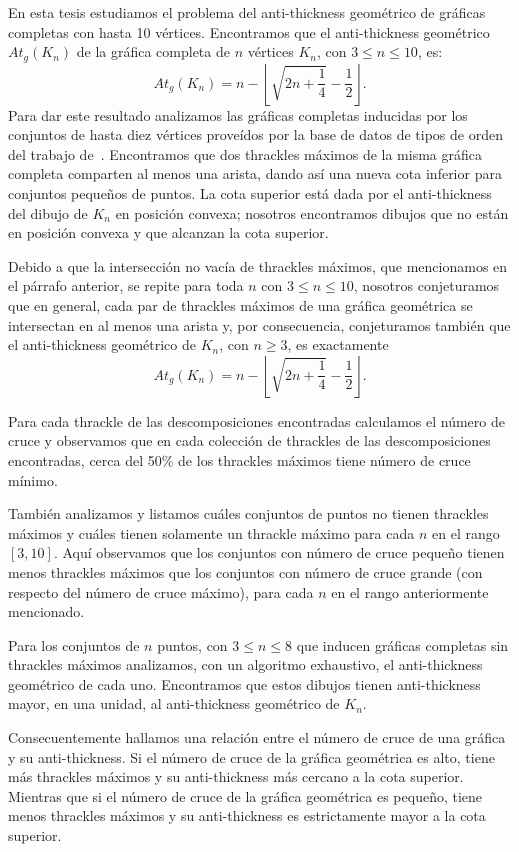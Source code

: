 En esta tesis estudiamos el problema del anti-thickness geométrico de gráficas completas con hasta 10
vértices. Encontramos que el anti-thickness geométrico $At_g(K_n)$ de la gráfica completa de $n$
vértices $K_n$, con $ 3 \leq n \leq 10$, es:
\[ At_g(K_n) =  n - \left\lfloor \sqrt{2n + \frac{1}{4}} - \frac{1}{2}\right\rfloor. \]
Para dar este resultado analizamos las gráficas completas inducidas por los conjuntos de hasta diez
vértices proveídos por la base de datos de tipos de orden del trabajo de~\cite{Aichholzer2001}. Encontramos
que dos thrackles máximos de la misma gráfica completa comparten al menos una arista, dando así una nueva
cota inferior para conjuntos pequeños de puntos. La cota superior está dada por el anti-thickness del
dibujo de $K_n$ en posición convexa; nosotros encontramos dibujos que no están en posición convexa y que
alcanzan la cota superior.

Debido a que la intersección no vacía de thrackles máximos, que mencionamos en el párrafo anterior, se
repite para toda $n$ con $3 \leq n \leq 10$,  nosotros conjeturamos que en general, cada par de thrackles
máximos de una gráfica geométrica se intersectan en al menos una arista y, por consecuencia, conjeturamos
también que el anti-thickness geométrico de $K_n$, con $n \geq 3$, es exactamente
\[ At_g(K_n) =  n - \left\lfloor \sqrt{2n + \frac{1}{4}} - \frac{1}{2}\right\rfloor. \]

Para cada thrackle de las descomposiciones encontradas calculamos el número
de cruce y observamos que en cada colección de thrackles de las descomposiciones encontradas, cerca del
50\% de los thrackles máximos tiene número de cruce mínimo.

También analizamos y listamos cuáles conjuntos de puntos no tienen thrackles máximos y cuáles tienen
solamente un thrackle máximo para cada $n$ en el rango $[3,10]$. Aquí observamos que los
conjuntos con número de cruce pequeño tienen menos thrackles máximos que los conjuntos con número de
cruce grande (con respecto del número de cruce máximo), para cada $n$ en el rango anteriormente mencionado.

Para los conjuntos de $n$ puntos, con $3 \leq n \leq 8$ que inducen gráficas completas sin thrackles
máximos analizamos, con un algoritmo exhaustivo, el anti-thickness geométrico de cada uno. Encontramos que
estos dibujos tienen anti-thickness mayor, en una unidad, al anti-thickness geométrico de $K_n$.

Consecuentemente hallamos una relación entre el número de cruce de una gráfica y su anti-thickness. Si el
número de cruce de la gráfica geométrica es alto, tiene más thrackles máximos y su anti-thickness más
cercano a la cota superior. Mientras que si el número de cruce de la gráfica geométrica es pequeño, tiene
menos thrackles máximos y su anti-thickness es estrictamente mayor a la cota superior.

